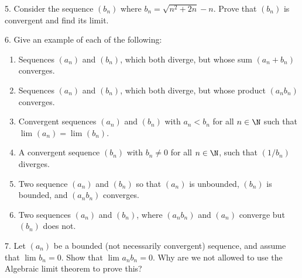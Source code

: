 5. Consider the sequence $\left( b_n \right) $ where $b_n = \sqrt{n^{2} + 2n} - n$. Prove that $\left( b_n \right) $ is convergent and find its limit.

6. Give an example of each of the following:
\begin{enumerate}
	\item Sequences $\left( a_n \right)$ and $ \left( b_n \right) $, which both diverge, but whose sum $\left( a_n + b_n \right) $ converges.
	\item Sequences $\left( a_n \right) $ and $\left( b_n \right)$, which both diverge, but whose product $\left( a_n b_n \right) $ converges.
	\item Convergent sequences $\left( a_n \right) $ and $\left( b_n \right) $ with $a_n < b_n$ for all $n \in \N$ such that $\lim_{} \left( a_n \right) = \lim_{} \left( b_n \right) $.
	\item A convergent sequence $\left( b_n \right) $ with $b_n \neq 0$ for all $n \in \N$, such that $\left( 1 / b_n \right)$ diverges.
	\item Two sequence $\left( a_n \right) $ and $\left( b_n \right) $ so that $\left( a_n \right) $ is unbounded, $\left( b_n \right) $ is bounded, and $\left( a_nb_n \right)$ converges.
	\item Two sequences $\left( a_n \right)$ and $ \left( b_n \right) $, where $\left( a_n b_n \right) $ and $\left( a_n \right) $ converge but $\left( b_n \right) $ does not.
\end{enumerate}

7. Let $\left( a_n \right) $ be a bounded (not necessarily convergent) sequence, and assume that $\lim_{} b_n = 0$. Show that $\lim_{} a_n b_n = 0$. Why are we not allowed to use the Algebraic limit theorem to prove this?

